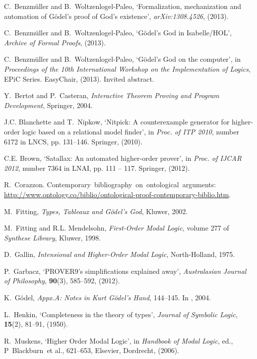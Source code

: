 \documentclass{birkjour}
\theoremstyle{definition}
\theoremstyle{remark}
\numberwithin{equation}{section}
\begin{document}
\begin{thebibliography}{1}
C.~Benzm{\"u}ller and B.~Woltzenlogel-Paleo, `Formalization, mechanization and
  automation of {G{\"o}del's} proof of {God's} existence', {\em
  arXiv:1308.4526}, (2013).

C.~Benzm\"uller and B.~Woltzenlogel-Paleo, `{G{\"o}del's God in Isabelle/HOL}',
  {\em Archive of Formal Proofs}, (2013).

C.~Benzm\"uller and B.~Woltzenlogel-Paleo, `G\"odel's {God} on the computer',
  in {\em Proceedings of the 10th International Workshop on the Implementation
  of Logics}, EPiC Series. EasyChair, (2013).
\newblock Invited abstract.

Y.~Bertot and P.~Casteran, {\em {Interactive Theorem Proving and Program
  Development}}, Springer, 2004.

J.C. Blanchette and T.~Nipkow, `Nitpick: A counterexample generator for
  higher-order logic based on a relational model finder', in {\em Proc. of ITP
  2010}, number 6172 in LNCS, pp. 131--146. Springer, (2010).

C.E. Brown, `Satallax: An automated higher-order prover', in {\em Proc. of
  IJCAR 2012}, number 7364 in LNAI, pp. 111 -- 117. Springer, (2012).

R.~Corazzon.
\newblock Contemporary~bibliography~on~ontological~arguments: {\scriptsize
  \url{http://www.ontology.co/biblio/ontological-proof-contemporary-biblio.htm}}.

M.~Fitting, {\em Types, Tableaux and G\"odel's God}, Kluwer, 2002.

M.~Fitting and R.L. Mendelsohn, {\em First-Order Modal Logic}, volume 277 of
  {\em Synthese Library}, Kluwer, 1998.

D.~Gallin, {\em Intensional and Higher-Order Modal Logic}, North-Holland, 1975.

P.~Garbacz, `{PROVER9's} simplifications explained away', {\em Australasian
  Journal of Philosophy}, {\bf 90}(3),  585--592, (2012).

K.~G\"odel, {\em Appx.A: Notes in Kurt G\"odel's Hand},  144--145.
\newblock In  \cite{sobel2004logic}, 2004.

L.~Henkin, `Completeness in the theory of types', {\em Journal of Symbolic
  Logic}, {\bf 15}(2),  81--91, (1950).

R.~Muskens, `{Higher Order Modal Logic}', in {\em Handbook of Modal Logic},
  ed., P~Blackburn~et al.,  621--653, Elsevier, Dordrecht, (2006).


\end{thebibliography}
\end{document}
